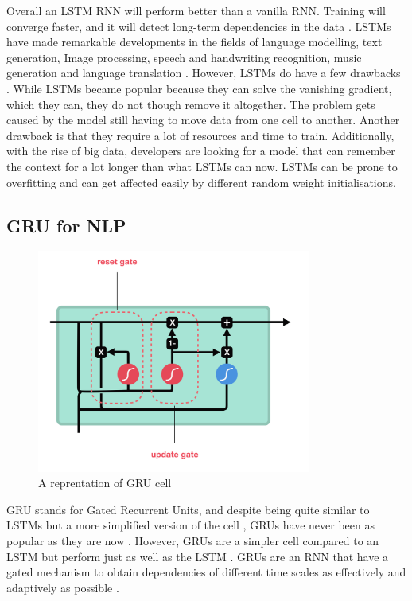 \documentclass[a4paper,10pt]{article}
\begin{document}
	Overall an LSTM RNN will perform better than a vanilla RNN.  Training will converge faster, and it will detect long-term dependencies in the data \cite{geron2019hands}. LSTMs have made remarkable developments in the fields of language modelling, text generation, Image processing, speech and handwriting recognition, music generation and language translation \cite{g4g}. However, LSTMs do have a few drawbacks \cite{g4g}. While LSTMs became popular because they can solve the vanishing gradient, which they can, they do not though remove it altogether. The problem gets caused by the model still having to move data from one cell to another. Another drawback is that they require a lot of resources and time to train. Additionally, with the rise of big data, developers are looking for a model that can remember the context for a lot longer than what LSTMs can now. LSTMs can be prone to overfitting and can get affected easily by different random weight initialisations.
	
\subsection{GRU for NLP}

	\begin{figure}
		\begin{center}
			\includegraphics[width=9cm]{GRU_example.png}
			\caption{A reprentation of GRU cell \cite{illustrated_lstm_gru}}
			\label{fig:gru_example}
		\end{center}
	\end{figure}

	GRU stands for Gated Recurrent Units, and despite being quite similar to LSTMs but a more simplified version of the cell \cite{geron2019hands, grus2019data}, GRUs have never been as popular as they are now \cite{g4g, geron2019hands}. However, GRUs are a simpler cell compared to an LSTM but perform just as well as the LSTM \cite{greff2016lstm}. GRUs are an RNN that have a gated mechanism to obtain dependencies of different time scales as effectively and adaptively as possible \cite{cho2014learning}. 
	
\end{document}

